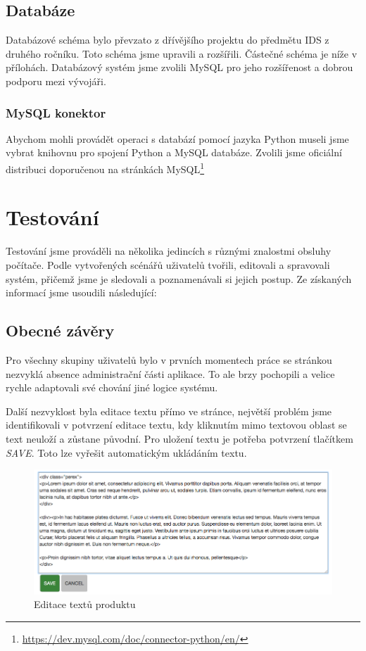 \documentclass[11pt,a4paper]{article}
\begin{document}
\subsection*{Databáze}
Databázové schéma bylo převzato z dřívějšího projektu do předmětu IDS z druhého ročníku. Toto schéma jsme upravili a rozšířili. Částečné schéma je níže v přílohách. Databázový systém jsme zvolili MySQL pro jeho rozšířenost a dobrou podporu mezi vývojáři.

\subsubsection*{MySQL konektor}
Abychom mohli provádět operaci s databází pomocí jazyka Python museli jsme vybrat knihovnu pro spojení Python a MySQL databáze. Zvolili jsme oficiální distribuci doporučenou na stránkách MySQL\footnote{\url{https://dev.mysql.com/doc/connector-python/en/}}



\section*{Testování}
Testování jsme prováděli na několika jedincích s různými znalostmi obsluhy počítače. Podle vytvořených scénářů uživatelů tvořili, editovali a spravovali systém, přičemž jsme je sledovali a poznamenávali si jejich postup. Ze získaných informací jsme usoudili následující:

\subsection*{Obecné závěry}
Pro všechny skupiny uživatelů bylo v prvních momentech práce se stránkou nezvyklá absence administrační části aplikace. To ale brzy pochopili a velice rychle adaptovali své chování jiné logice systému.

Další nezvyklost byla editace textu přímo ve stránce, největší problém jsme identifikovali v potvrzení editace textu, kdy kliknutím mimo textovou oblast se text neuloží a zůstane původní. Pro uložení textu je potřeba potvrzení tlačítkem {\em SAVE}. Toto lze vyřešit automatickým ukládáním textu.

\begin{figure}[h]
    \centering
    \includegraphics[width=\textwidth]{edit.png}
    \caption{Editace textů produktu}
\end{figure}
\end{document}
